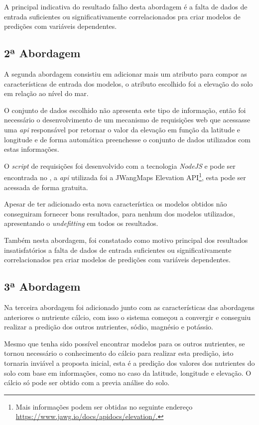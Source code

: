 \documentclass[
12pt,				%
oneside,			%
a4paper,			%
english,			%
french,				%
spanish,			%
brazil				%
]{abntex2}
\begin{document}
A principal indicativa do resultado falho desta abordagem é a falta de dados de entrada suficientes ou significativamente correlacionados pra criar modelos de predições com variáveis dependentes.

\subsection{2ª Abordagem}
A segunda abordagem consistiu em adicionar mais um atributo para compor as características de entrada dos modelos, o atributo escolhido foi a elevação do solo em relação ao nível do mar. 

O conjunto de dados escolhido não apresenta este tipo de informação, então foi necessário o desenvolvimento de um mecanismo de requisições web que acessasse uma \textit{api} responsável por retornar o valor da elevação em função da latitude e longitude e de forma automática preenchesse o conjunto de dados utilizados com estas informações.

O \textit{script} de requisições foi desenvolvido com a tecnologia \textit{NodeJS} e pode ser encontrada no , a \textit{api} utilizada foi a JWangMaps Elevation API\footnote[1]{Mais informações podem ser obtidas no seguinte endereço \href{https://www.jawg.io/docs/apidocs/elevation/}{https://www.jawg.io/docs/apidocs/elevation/.}}, esta pode ser acessada de forma gratuita.

Apesar de ter adicionado esta nova característica os modelos obtidos não conseguiram fornecer bons resultados, para nenhum dos modelos utilizados, apresentando o \textit{undefitting} em todos os resultados. 

Também nesta abordagem, foi constatado como motivo principal dos resultados insatisfatórios a falta de dados de entrada suficientes ou significativamente correlacionados pra criar modelos de predições com variáveis dependentes.

\subsection{3ª Abordagem}

Na terceira abordagem foi adicionado junto com as características das abordagens anteriores o nutriente cálcio, com isso o sistema começou a convergir e conseguiu realizar a predição dos outros nutrientes, sódio, magnésio e potássio. 

Mesmo que tenha sido possível encontrar modelos para os outros nutrientes, se tornou necessário o conhecimento do cálcio para realizar esta predição, isto tornaria inviável a proposta inicial, esta é a predição dos valores dos nutrientes do solo com base em informações, como no caso da latitude, longitude e elevação. O cálcio só pode ser obtido com a previa análise do solo. 
\end{document}
